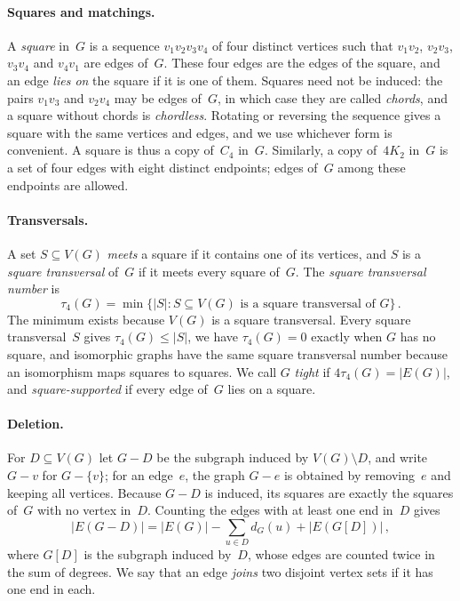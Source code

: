 \documentclass[11pt,letterpaper]{article}
\numberwithin{equation}{section}
\theoremstyle{plain}
\theoremstyle{definition}
\theoremstyle{remark}
\begin{document}
\paragraph{Squares and matchings.} A \emph{square} in~$G$ is a sequence $v_1v_2v_3v_4$ of four distinct vertices such that $v_1v_2$, $v_2v_3$, $v_3v_4$ and $v_4v_1$ are edges of~$G$. These four edges are the edges of the square, and an edge \emph{lies on} the square if it is one of them. Squares need not be induced: the pairs $v_1v_3$ and $v_2v_4$ may be edges of~$G$, in which case they are called \emph{chords}, and a square without chords is \emph{chordless}. Rotating or reversing the sequence gives a square with the same vertices and edges, and we use whichever form is convenient. A square is thus a copy of~$C_4$ in~$G$. Similarly, a copy of~$4K_2$ in~$G$ is a set of four edges with eight distinct endpoints; edges of~$G$ among these endpoints are allowed.

\paragraph{Transversals.} A set $S\subseteq V(G)$ \emph{meets} a square if it contains one of its vertices, and $S$ is a \emph{square transversal} of~$G$ if it meets every square of~$G$. The \emph{square transversal number} is
\begin{equation}\label{eq:tau}
\tau_4(G)=\min\{|S| : S\subseteq V(G) \text{ is a square transversal of } G\}\,.
\end{equation}
The minimum exists because $V(G)$ is a square transversal. Every square transversal~$S$ gives $\tau_4(G)\le|S|$, we have $\tau_4(G)=0$ exactly when $G$ has no square, and isomorphic graphs have the same square transversal number because an isomorphism maps squares to squares. We call $G$ \emph{tight} if $4\tau_4(G)=|E(G)|$, and \emph{square-supported} if every edge of~$G$ lies on a square.

\paragraph{Deletion.} For $D\subseteq V(G)$ let $G-D$ be the subgraph induced by $V(G)\setminus D$, and write $G-v$ for $G-\{v\}$; for an edge~$e$, the graph $G-e$ is obtained by removing~$e$ and keeping all vertices. Because $G-D$ is induced, its squares are exactly the squares of~$G$ with no vertex in~$D$. Counting the edges with at least one end in~$D$ gives
\begin{equation}\label{eq:edgecount}
|E(G-D)|=|E(G)|-\sum_{u\in D}d_G(u)+|E(G[D])|\,,
\end{equation}
where $G[D]$ is the subgraph induced by~$D$, whose edges are counted twice in the sum of degrees. We say that an edge \emph{joins} two disjoint vertex sets if it has one end in each.
\end{document}
